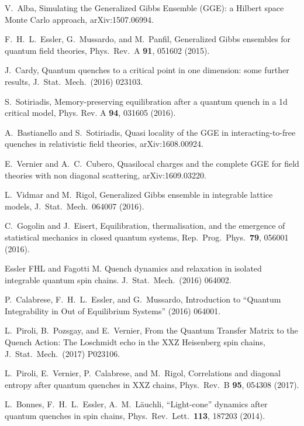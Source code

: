 \documentclass[twocolumn,superscriptaddress,prb,10pt]{revtex4-1}
\begin{document}
\begin{thebibliography}{99}
	V.~Alba, Simulating the Generalized Gibbs Ensemble (GGE): a Hilbert space Monte Carlo approach, arXiv:1507.06994.

	F.~H.~L.~Essler, G.~Mussardo, and M.~Panfil, 
	Generalized Gibbs ensembles for quantum field theories, 
	Phys.\ Rev.\ A {\bf 91}, 051602 (2015).

	J.~Cardy, Quantum quenches to a critical point in one dimension: some further results, 
	J.\ Stat.\ Mech.\ (2016) 023103.

	S.~Sotiriadis, Memory-preserving equilibration after
	a quantum quench in a 1d critical model,  Phys. Rev. A {\bf 94}, 031605 (2016).


	A.~Bastianello  and S.~Sotiriadis, Quasi locality of the GGE in interacting-to-free  quenches 
	in relativistic field theories, arXiv:1608.00924.

	E.~Vernier and A.~C.~Cubero, Quasilocal charges and the complete GGE for field theories with non
	diagonal scattering, arXiv:1609.03220.


	L.~Vidmar and M.~Rigol, Generalized Gibbs ensemble in integrable lattice models, 
	J.\ Stat.\ Mech.\ 064007 (2016).

	C.~Gogolin and J.~Eisert, 
	Equilibration, thermalisation, and the emergence of statistical mechanics in closed quantum systems, 
	Rep.\ Prog.\ Phys.\ {\bf 79}, 056001 (2016).


	Essler FHL and Fagotti M.  Quench dynamics and relaxation in isolated integrable quantum spin chains.
	J.\ Stat.\ Mech.\ (2016) 064002.


	P.~Calabrese, F.~H.~L.~Essler, and G.~Mussardo, 
	Introduction to ``Quantum Integrability in Out of Equilibrium Systems'' (2016) 064001.


	L.~Piroli, B.~Pozsgay, and E.~Vernier,
	From the Quantum Transfer Matrix to the Quench Action: The Loschmidt echo in the XXZ 
	Heisenberg spin chains, 
	J.\ Stat.\ Mech.\ (2017) P023106. 

	L.~Piroli, E.~Vernier, P.~Calabrese, and M.~Rigol, Correlations and diagonal entropy after quantum 
	quenches in XXZ chains, Phys.\ Rev.\ B {\bf 95}, 054308 (2017). 

L.~Bonnes, F.~H.~L.~Essler, A.~M.~L\"auchli, 
``Light-cone'' dynamics after quantum quenches in spin chains, 
Phys.\ Rev.\ Lett.\ {\bf 113}, 187203 (2014). 


\end{thebibliography}
\end{document}
